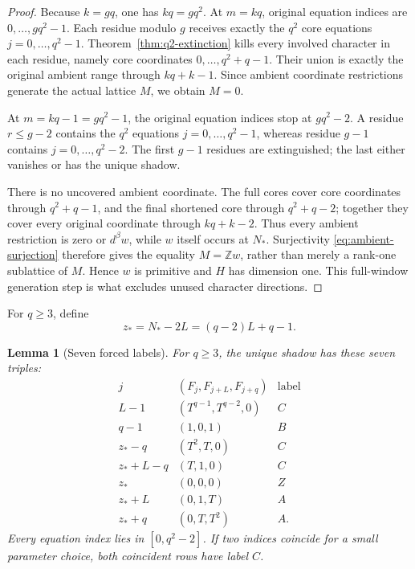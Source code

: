 \documentclass[11pt]{article}
\newcommand{\Z}{\mathbb{Z}}
\newtheorem{lemma}{Lemma}[section]
\theoremstyle{remark}
\numberwithin{equation}{section}
\begin{document}
\begin{proof}
Because \(k=gq\), one has \(kq=gq^2\).  At \(m=kq\), original equation indices are \(0,\ldots,gq^2-1\).  Each residue modulo \(g\) receives exactly the \(q^2\) core equations \(j=0,\ldots,q^2-1\).  Theorem~\ref{thm:q2-extinction} kills every involved character in each residue, namely core coordinates \(0,\ldots,q^2+q-1\).  Their union is exactly the original ambient range through \(kq+k-1\).  Since ambient coordinate restrictions generate the actual lattice \(M\), we obtain \(M=0\).

At \(m=kq-1=gq^2-1\), the original equation indices stop at \(gq^2-2\).  A residue \(r\leq g-2\) contains the \(q^2\) equations \(j=0,\ldots,q^2-1\), whereas residue \(g-1\) contains \(j=0,\ldots,q^2-2\).  The first \(g-1\) residues are extinguished; the last either vanishes or has the unique shadow.

There is no uncovered ambient coordinate.  The full cores cover core coordinates through \(q^2+q-1\), and the final shortened core through \(q^2+q-2\); together they cover every original coordinate through \(kq+k-2\).  Thus every ambient restriction is zero or \(d^\beta w\), while \(w\) itself occurs at \(N_\ast\).  Surjectivity \eqref{eq:ambient-surjection} therefore gives the equality \(M=\Z w\), rather than merely a rank-one sublattice of \(M\).  Hence \(w\) is primitive and \(H\) has dimension one.  This full-window generation step is what excludes unused character directions.
\end{proof}

For \(q\geq3\), define
\begin{equation}\label{eq:zstar}
 z_\ast=N_\ast-2L=(q-2)L+q-1.
\end{equation}

\begin{lemma}[Seven forced labels]\label{lem:seven-labels}
For \(q\geq3\), the unique shadow has these seven triples:
\[
\begin{array}{c|c|c}
 j&(F_j,F_{j+L},F_{j+q})&\text{label}\\ \hline
 L-1&(T^{q-1},T^{q-2},0)&C\\
 q-1&(1,0,1)&B\\
 z_\ast-q&(T^2,T,0)&C\\
 z_\ast+L-q&(T,1,0)&C\\
 z_\ast&(0,0,0)&Z\\
 z_\ast+L&(0,1,T)&A\\
 z_\ast+q&(0,T,T^2)&A.
\end{array}
\]
Every equation index lies in \([0,q^2-2]\).  If two indices coincide for a small parameter choice, both coincident rows have label \(C\).
\end{lemma}
\end{document}
